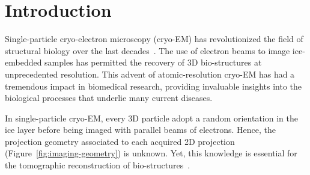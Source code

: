\section{Introduction}

Single-particle cryo-electron microscopy (cryo-EM) has revolutionized the field of structural biology over the last decades~\cite{dubochet1988cryo, frank2006three,chap0-nat2015MethodYear}. The use of electron beams to image ice-embedded samples has permitted the recovery of 3D bio-structures at unprecedented resolution. This advent of atomic-resolution cryo-EM has had a tremendous impact in biomedical research, providing invaluable insights into the biological processes that underlie many current diseases.

In single-particle cryo-EM, every 3D particle adopt a random orientation in the ice layer before being imaged with parallel beams of electrons.
Hence, the projection geometry associated to each acquired 2D projection (Figure~\ref{fig:imaging-geometry}) is unknown. Yet, this knowledge is essential for the tomographic reconstruction of bio-structures~\cite{Natterer2001mathematics}.

